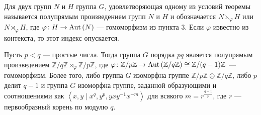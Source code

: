 Для двух групп $ N $ и $ H $ группа $ G $, удовлетворяющая одному из условий теоремы называется \textcolor{defcolor}{полупрямым произведением} групп $ N $ и $ H $ и обозначается $ N \leftthreetimes_{\varphi} H $ или $ N \rtimes_{\varphi} H $,
где $ \varphi \colon H \to \mathrm{Aut}\left(N\right) $ --- гомоморфизм из пункта 3. Если $ \varphi $ известно из контекста, то этот индекс опускается.

\begin{theorem} \label {pq groups}
	Пусть $ p < q $ --- простые числа. Тогда группа $ G $ порядка $ pq $ является полупрямым произведением
	$ \mathbb{Z}/q\mathbb{Z} \rtimes_{\varphi} \mathbb{Z}/p\mathbb{Z} $, где
	$ \varphi \colon \mathbb{Z}/p\mathbb{Z} \to \mathrm{Aut}\left(\mathbb{Z}/q\mathbb{Z}\right) \cong \mathbb{Z}/(q - 1)\mathbb{Z} $ --- гомоморфизм. Более того, 
	либо группа $ G $ изоморфна группе $ \mathbb{Z}/p\mathbb{Z} \oplus \mathbb{Z}/q\mathbb{Z} $,
	либо $ p $ делит $ q - 1 $ и группа $ G $ изоморфна группе, заданной образующими и соотношениями
	как $ \left< x, y \mid x^q, y^p, yxy^{-1}x^{-m} \right> $ для всякого $ m = r^{\tfrac{q - 1}{p}} $, где $ r $ --- первообразный корень по модулю $ q $.
\end{theorem}

